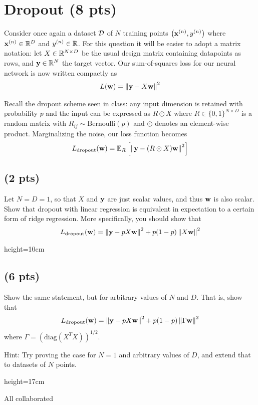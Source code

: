 \section{Dropout (8 pts)}

Consider once again a dataset ${\cal{D}}$ of $N$ training points $\left({\bf{x}}^{(n)}, y^{(n)}\right)$ where ${\bf{x}}^{(n)} \in {\mathbb{R}}^D$ and $y^{(n)} \in {\mathbb{R}}$. For this question it will be easier to adopt a matrix notation: let $X \in {\mathbb{R}}^{N \times D}$ be the usual design matrix containing datapoints as rows, and ${\bf{y}} \in {\mathbb{R}}^N$ the target vector. Our sum-of-squares loss for our neural network is now written compactly as
\begin{align}
L({\bf{w}}) = \left\lVert {\bf{y}} - X {\bf{w}} \right\rVert^2
\end{align}

Recall the dropout scheme seen in class: any input dimension is retained with probability $p$ and the input can be expressed as $R \odot X$ where $R \in \{0,1\}^{N \times D}$ is a random matrix with $R_{ij} \sim \text{Bernoulli}(p)$ and $\odot$ denotes an element-wise product. Marginalizing the noise, our loss function becomes
\begin{align}
L_{\text{dropout}}({\bf{w}}) = {\mathbb{E}}_{R}\left[ \left\lVert {\bf{y}} - (R \odot X) {\bf{w}} \right\rVert^2 \right]
\end{align}


\subsection{(2 pts)}

Let $N=D=1$, so that $X$ and ${\bf{y}}$ are just scalar values, and thus ${\bf{w}}$ is also scalar. Show that dropout with linear regression is equivalent in expectation to a certain form of ridge regression. More specifically, you should show that
\begin{align}
L_{\text{dropout}}({\bf{w}}) = \left\lVert {\bf{y}} - p X {\bf{w}} \right\rVert^2 + p(1-p)\left\lVert X {\bf{w}} \right\rVert^2
\end{align}

\begin{soln}{height=10cm}
\TwoA
\end{soln}

\subsection{(6 pts)}

Show the same statement, but for arbitrary values of $N$ and $D$. That is, show that
\begin{align}
L_{\text{dropout}}({\bf{w}}) = \left\lVert {\bf{y}} - p X {\bf{w}} \right\rVert^2 + p(1-p)\left\lVert \Gamma {\bf{w}} \right\rVert^2
\end{align}
where $\Gamma = (\text{diag}(X^T X))^{1/2}$. 

Hint: Try proving the case for $N=1$ and arbitrary values of $D$, and extend that to datasets of $N$ points.

\begin{soln}{height=17cm}
\TwoB
\end{soln}

\begin{qauthor}
All collaborated
\end{qauthor}